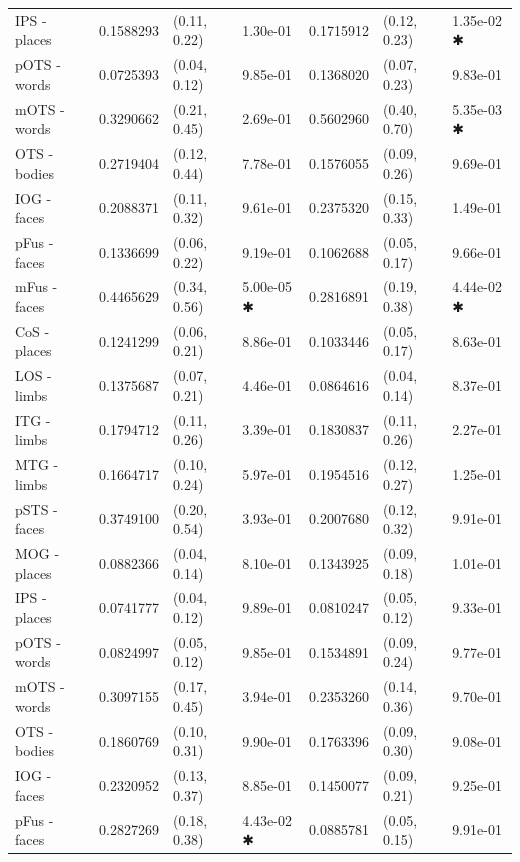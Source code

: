\begin{ThreePartTable}
\begin{longtable}{lrllrll}
\hspace{1em}\hspace{1em}\hspace{1em}\hspace{1em}IPS - places & 0.1588293 & (0.11, 0.22) & 1.30e-01 & 0.1715912 & (0.12, 0.23) & 1.35e-02 ✱\\
pOTS - words & 0.0725393 & (0.04, 0.12) & 9.85e-01 & 0.1368020 & (0.07, 0.23) & 9.83e-01\\
mOTS - words & 0.3290662 & (0.21, 0.45) & 2.69e-01 & 0.5602960 & (0.40, 0.70) & 5.35e-03 ✱\\
OTS - bodies & 0.2719404 & (0.12, 0.44) & 7.78e-01 & 0.1576055 & (0.09, 0.26) & 9.69e-01\\
IOG - faces & 0.2088371 & (0.11, 0.32) & 9.61e-01 & 0.2375320 & (0.15, 0.33) & 1.49e-01\\
pFus - faces & 0.1336699 & (0.06, 0.22) & 9.19e-01 & 0.1062688 & (0.05, 0.17) & 9.66e-01\\
mFus - faces & 0.4465629 & (0.34, 0.56) & 5.00e-05 ✱ & 0.2816891 & (0.19, 0.38) & 4.44e-02 ✱\\
CoS - places & 0.1241299 & (0.06, 0.21) & 8.86e-01 & 0.1033446 & (0.05, 0.17) & 8.63e-01\\
LOS - limbs & 0.1375687 & (0.07, 0.21) & 4.46e-01 & 0.0864616 & (0.04, 0.14) & 8.37e-01\\
ITG - limbs & 0.1794712 & (0.11, 0.26) & 3.39e-01 & 0.1830837 & (0.11, 0.26) & 2.27e-01\\
MTG - limbs & 0.1664717 & (0.10, 0.24) & 5.97e-01 & 0.1954516 & (0.12, 0.27) & 1.25e-01\\
pSTS - faces & 0.3749100 & (0.20, 0.54) & 3.93e-01 & 0.2007680 & (0.12, 0.32) & 9.91e-01\\
MOG - places & 0.0882366 & (0.04, 0.14) & 8.10e-01 & 0.1343925 & (0.09, 0.18) & 1.01e-01\\
IPS - places & 0.0741777 & (0.04, 0.12) & 9.89e-01 & 0.0810247 & (0.05, 0.12) & 9.33e-01\\
pOTS - words & 0.0824997 & (0.05, 0.12) & 9.85e-01 & 0.1534891 & (0.09, 0.24) & 9.77e-01\\
mOTS - words & 0.3097155 & (0.17, 0.45) & 3.94e-01 & 0.2353260 & (0.14, 0.36) & 9.70e-01\\
OTS - bodies & 0.1860769 & (0.10, 0.31) & 9.90e-01 & 0.1763396 & (0.09, 0.30) & 9.08e-01\\
IOG - faces & 0.2320952 & (0.13, 0.37) & 8.85e-01 & 0.1450077 & (0.09, 0.21) & 9.25e-01\\
pFus - faces & 0.2827269 & (0.18, 0.38) & 4.43e-02 ✱ & 0.0885781 & (0.05, 0.15) & 9.91e-01\\

\end{longtable}
\end{ThreePartTable}

